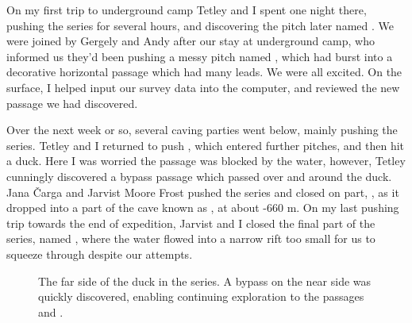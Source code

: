 On my first trip to underground camp Tetley and I spent one night there, pushing the  series for several hours, and discovering the pitch later named . We were joined
by Gergely and Andy after our stay at underground camp, who informed us they'd been pushing a
messy pitch named , which had burst into a decorative horizontal passage which had many
leads. We were all excited. On the surface, I helped input our survey data into the computer, and
reviewed the new passage we had discovered.


Over the next week or so, several caving parties went below, mainly pushing the  series.
Tetley and I returned to push , which entered further pitches, and then hit a duck. Here I was worried the passage was blocked by the water, however, Tetley cunningly discovered a bypass
passage which passed over and around the duck. Jana Čarga and Jarvist Moore Frost pushed the series
and closed on part, , as it dropped into a part of the cave known as , at about -660 m.
On my last pushing trip towards the end of expedition, Jarvist and I closed the final part of the  series, named , where the water flowed into a narrow rift too small for us to squeeze through despite our attempts.


\begin{figure}[t!]
\checkoddpage \ifoddpage \forcerectofloat \else \forceversofloat \fi
{}
\caption{The far side of the duck in the  series. A bypass on the near side was quickly discovered, enabling continuing exploration to the passages  and . }
\end{figure}


